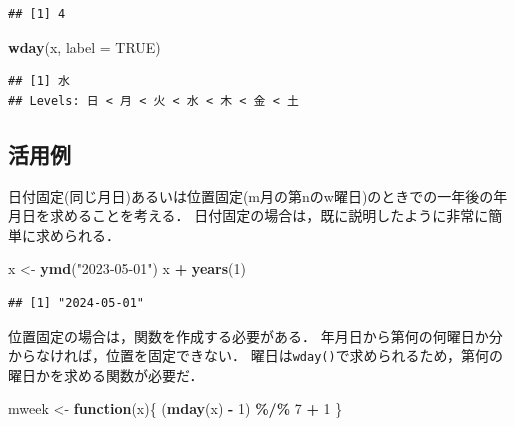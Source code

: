 \documentclass[
]{article}
\newenvironment{Shaded}{\begin{snugshade}}{\end{snugshade}}
\newcommand{\AttributeTok}[1]{\textcolor[rgb]{0.13,0.29,0.53}{#1}}
\newcommand{\ConstantTok}[1]{\textcolor[rgb]{0.56,0.35,0.01}{#1}}
\newcommand{\ControlFlowTok}[1]{\textcolor[rgb]{0.13,0.29,0.53}{\textbf{#1}}}
\newcommand{\DecValTok}[1]{\textcolor[rgb]{0.00,0.00,0.81}{#1}}
\newcommand{\FunctionTok}[1]{\textcolor[rgb]{0.13,0.29,0.53}{\textbf{#1}}}
\newcommand{\NormalTok}[1]{#1}
\newcommand{\OtherTok}[1]{\textcolor[rgb]{0.56,0.35,0.01}{#1}}
\newcommand{\SpecialCharTok}[1]{\textcolor[rgb]{0.81,0.36,0.00}{\textbf{#1}}}
\newcommand{\StringTok}[1]{\textcolor[rgb]{0.31,0.60,0.02}{#1}}
\begin{document}
\begin{verbatim}
## [1] 4
\end{verbatim}

\begin{Shaded}
\begin{Highlighting}[]
\FunctionTok{wday}\NormalTok{(x, }\AttributeTok{label =} \ConstantTok{TRUE}\NormalTok{)}
\end{Highlighting}
\end{Shaded}

\begin{verbatim}
## [1] 水
## Levels: 日 < 月 < 火 < 水 < 木 < 金 < 土
\end{verbatim}

\hypertarget{ux6d3bux7528ux4f8b-1}{%
\subsection{活用例}\label{ux6d3bux7528ux4f8b-1}}

日付固定(同じ月日)あるいは位置固定(m月の第nのw曜日)のときでの一年後の年月日を求めることを考える．
日付固定の場合は，既に説明したように非常に簡単に求められる．

\begin{Shaded}
\begin{Highlighting}[]
\NormalTok{x }\OtherTok{\textless{}{-}} \FunctionTok{ymd}\NormalTok{(}\StringTok{"2023{-}05{-}01"}\NormalTok{)}
\NormalTok{x }\SpecialCharTok{+} \FunctionTok{years}\NormalTok{(}\DecValTok{1}\NormalTok{)}
\end{Highlighting}
\end{Shaded}

\begin{verbatim}
## [1] "2024-05-01"
\end{verbatim}

位置固定の場合は，関数を作成する必要がある．
年月日から第何の何曜日か分からなければ，位置を固定できない．
曜日は\texttt{wday()}で求められるため，第何の曜日かを求める関数が必要だ．

\begin{Shaded}
\begin{Highlighting}[]
\NormalTok{mweek }\OtherTok{\textless{}{-}} \ControlFlowTok{function}\NormalTok{(x)\{}
\NormalTok{  (}\FunctionTok{mday}\NormalTok{(x) }\SpecialCharTok{{-}} \DecValTok{1}\NormalTok{) }\SpecialCharTok{\%/\%} \DecValTok{7} \SpecialCharTok{+} \DecValTok{1}
\NormalTok{\}}
\end{Highlighting}
\end{Shaded}
\end{document}
